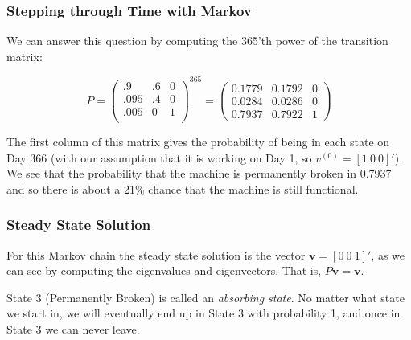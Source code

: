 \documentclass[10pt]{beamer}
\begin{document}
\begin{frame}
\frametitle{Stepping through Time with Markov}

We can answer this question by computing the 365'th power of the
transition matrix:

$$P =
\left(%
\begin{array}{lll}
  .9 & .6 & 0 \\
  .095 & .4 & 0 \\
  .005 & 0 & 1 \\
\end{array}%
\right)^{365} =
\left(%
\begin{array}{lll}
    0.1779 & 0.1792 & 0 \\
    0.0284 & 0.0286 & 0 \\
    0.7937 & 0.7922 & 1
\end{array}%
\right)
$$

The first column of this matrix gives the probability of being in
each state on Day 366 (with our assumption that it is working on
Day 1, so $v^{(0)} = [1~0~0]'$).  We see that the probability that
the machine is permanently broken in 0.7937 and so there is about
a 21\% chance that the machine is still functional.
\end{frame}
\begin{frame}
\frametitle{Steady State Solution}

For this Markov chain the steady state solution is the vector
$\textbf{v} = [0~0~1]'$, as we can see by computing the
eigenvalues and eigenvectors.  That is, $P\textbf{v} =
\textbf{v}$.
\bigskip
\bigskip

State 3 (Permanently Broken) is called an {\it absorbing state}.
No matter what state we start in, we will eventually end up in
State 3 with probability 1, and once in State 3 we can never
leave.
\end{frame}
\end{document}
